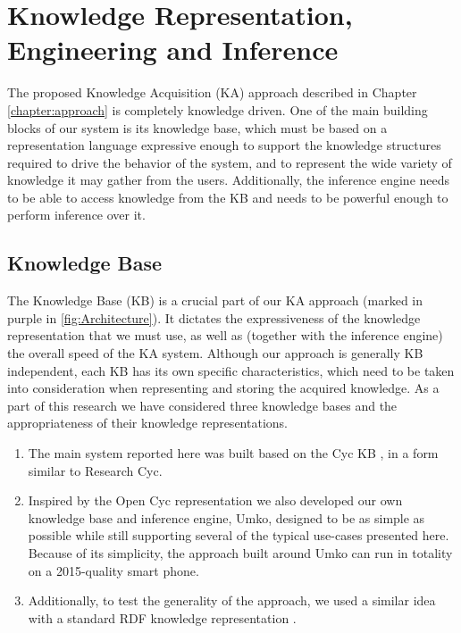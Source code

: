 \section{Knowledge Representation, Engineering and Inference}
\label{section:bg:knowledge}
The proposed Knowledge Acquisition (KA) approach described in 
Chapter \ref{chapter:approach} is completely knowledge driven. One of the main 
building blocks of our system is its knowledge base, which must be based on a 
representation language expressive enough to support the knowledge structures 
required to drive the behavior of the system, and to represent the wide variety 
of knowledge it may gather from the users. Additionally, the inference engine 
needs to be able to access knowledge from the KB and needs to be powerful enough 
to perform inference over it.

\subsection{Knowledge Base}
\label{section:bg:kb}
The Knowledge Base (KB) is a crucial part of our KA approach 
(marked in purple in \autoref{fig:Architecture}). It dictates the expressiveness 
of the knowledge representation that we must use, as well as 
(together with the inference engine) the overall speed of the KA system. 
Although our approach is generally KB independent, each KB has its own 
specific characteristics, which need to be taken into consideration when 
representing and storing the acquired knowledge. As a part of this research we 
have considered three knowledge bases and the appropriateness of their 
knowledge representations.

\begin{enumerate}
\item The main system reported here was built based on the Cyc KB
\parencite{Lenat1995}, in a form similar to Research Cyc. 
\item Inspired by the Open Cyc representation we also developed our own 
knowledge base and inference engine, Umko, designed to be as simple as possible
while still supporting several of the typical use-cases presented here. 
Because of its simplicity, the approach built around Umko can run in totality 
on a 2015-quality smart phone.
\item Additionally, to test the generality of the approach, we used a similar 
idea with a standard RDF knowledge representation \parencite{Bradesko2012}.
\end{enumerate}

